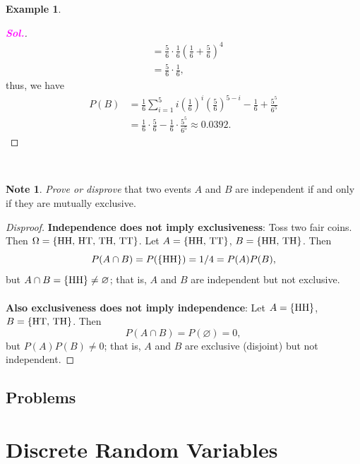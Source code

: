 \documentclass[12pt,a4paper]{article}
\theoremstyle{definition}
\newtheorem{example}{Example}[section]
\theoremstyle{definition}
\theoremstyle{definition}
\theoremstyle{definition}
\theoremstyle{remark}
\theoremstyle{definition}
\newtheorem*{note}{Note}
\newcommand{\sol}{\textcolor{magenta}{\bf \textit{Sol.}}\quad}
\begin{document}
\begin{example}
\begin{proof}[\sol]
\begin{align*}
		&=\frac{5}{6}\cdot\frac{1}{6}\left(\frac{1}{6}+\frac{5}{6}\right)^4\\
		&=\frac{5}{6}\cdot\frac{1}{6},
		\end{align*} thus, we have \begin{align*}
		P(B)&=\frac{1}{6}\sum_{i=1}^{5}i\left(\frac{1}{6}\right)^i\left(\frac{5}{6}\right)^{5-i}-\frac{1}{6}+\frac{5^5}{6^5}\\
		&=\frac{1}{6}\cdot\frac{5}{6}-\frac{1}{6}\cdot\frac{5^5}{6^5}\approx0.0392.
		\end{align*}
	\end{proof}
\end{example}\
\\
\begin{note}
	\textit{Prove or disprove} that two events $A$ and $B$ are independent if and only if they are mutually exclusive.\begin{proof}[Disproof]
		\textbf{Independence does not imply exclusiveness}: Toss two fair coins. Then $\Omega=\set{\text{HH, HT, TH, TT}}$. Let $A=\set{\text{HH, TT}}$, $B=\set{\text{HH, TH}}$. Then \[P(A\cap B)=P(\set{\text{HH}})=1/4=P(A)P(B),\] but $A\cap B=\set{\text{HH}}\neq\varnothing$; that is, $A$ and $B$ are independent but not exclusive.\\
		\\
		\textbf{Also exclusiveness does not imply independence}: Let $A=\set{\text{HH}}$, $B=\set{\text{HT, TH}}$. Then \[P(A\cap B)=P(\varnothing)=0,\] but $P(A)P(B)\neq 0$; that is, $A$ and $B$ are exclusive (disjoint) but not independent.
	\end{proof}
\end{note}

\newpage
\subsection{Problems}

\newpage
\section{Discrete Random Variables}
\end{document}
